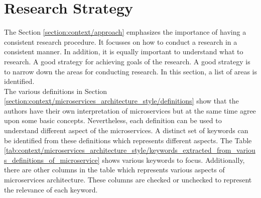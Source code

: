 \section{Research Strategy}\label{section:context/research_strategy}
The Section \ref{section:context/approach} emphasizes the importance of having a consistent research procedure. It focusses on how to conduct a research in a consistent manner. In addition, it is equally important to understand what to research. A good strategy for achieving goals of the research. A good strategy is to narrow down the areas for conducting research. In this section, a list of areas is identified.\\
The various definitions in Section \ref{section:context/microservices_architecture_style/definitions} show that the authors have their own interpretation of microservices but at the same time agree upon some basic concepts. Nevertheless, each definition can be used to understand different aspect of the microservices. A distinct set of keywords can be identified from these definitions which represents different aspects. The Table \ref{tab:context/microservices_architecture_style/keywords_extracted_from_various_definitions_of_microservice} shows various keywords to focus. Additionally, there are other columns in the table which represents various aspects of microservices architecture. These columns are checked or unchecked to represent the relevance of each keyword. 

